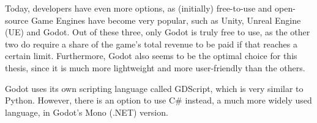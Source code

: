 
Today, developers have even more options, as (initially) free-to-use and open-source Game Engines have become very popular, such as Unity, Unreal Engine (UE) and Godot. Out of these three, only Godot is truly free to use, as the other two do require a share of the game's total revenue to be paid if that reaches a certain limit. Furthermore, Godot also seems to be the optimal choice for this thesis, since it is much more lightweight and more user-friendly than the others.

Godot uses its own scripting language called GDScript, which is very similar to Python. However, there is an option to use C\# instead, a much more widely used language, in Godot's Mono (.NET) version.


